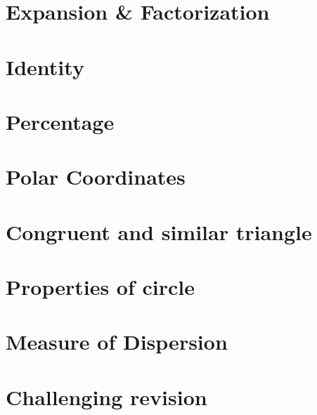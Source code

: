 \documentclass[12pt]{book}
\begin{document}
    \chapter{Expansion \& Factorization}

    \chapter{Identity}

    \chapter{Percentage}

    \chapter{Polar Coordinates}

    \chapter{Congruent and similar triangle}

    \chapter{Properties of circle}

    \chapter{Measure of Dispersion}

    \chapter{Challenging revision}
\end{document}
